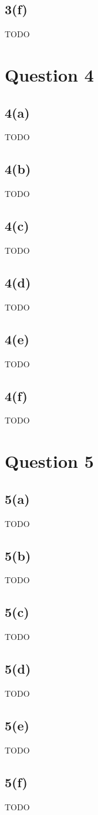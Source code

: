 \documentclass[10pt, a4paper,reqno]{article}
\begin{document}
\subsection*{3(f)}
TODO


%
%
\clearpage\section*{Question 4}

\subsection*{4(a)}
TODO

\subsection*{4(b)}
TODO

\subsection*{4(c)}
TODO

\subsection*{4(d)}
TODO

\subsection*{4(e)}
TODO

\subsection*{4(f)}
TODO


%
%
\clearpage\section*{Question 5}

\subsection*{5(a)}
TODO

\subsection*{5(b)}
TODO

\subsection*{5(c)}
TODO

\subsection*{5(d)}
TODO

\subsection*{5(e)}
TODO

\subsection*{5(f)}
TODO
\end{document}
